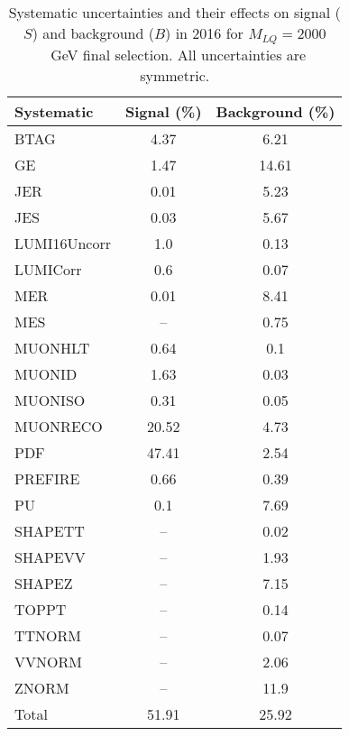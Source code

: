 \begin{table}[htbp]
\begin{center}
\caption{Systematic uncertainties and their effects on signal ($S$) and background ($B$) in 2016 for $M_{LQ}=2000$~GeV final selection. All uncertainties are symmetric.}
\begin{tabular}{lcc}
\hline\hline
Systematic & Signal (\%) & Background (\%) \\ \hline 
BTAG & 4.37 & 6.21\\ 
GE & 1.47 & 14.61\\ 
JER & 0.01 & 5.23\\ 
JES & 0.03 & 5.67\\ 
LUMI16Uncorr & 1.0 & 0.13\\ 
LUMICorr & 0.6 & 0.07\\ 
MER & 0.01 & 8.41\\ 
MES & -- & 0.75\\ 
MUONHLT & 0.64 & 0.1\\ 
MUONID & 1.63 & 0.03\\ 
MUONISO & 0.31 & 0.05\\ 
MUONRECO & 20.52 & 4.73\\ 
PDF & 47.41 & 2.54\\ 
PREFIRE & 0.66 & 0.39\\ 
PU & 0.1 & 7.69\\ 
SHAPETT & -- & 0.02\\ 
SHAPEVV & -- & 1.93\\ 
SHAPEZ & -- & 7.15\\ 
TOPPT & -- & 0.14\\ 
TTNORM & -- & 0.07\\ 
VVNORM & -- & 2.06\\ 
ZNORM & -- & 11.9\\ 
Total & 51.91 & 25.92\\ \hline \hline
\end{tabular}
\label{tab:SysUncertainties_uujj_2000}
\end{center}
\end{table}

